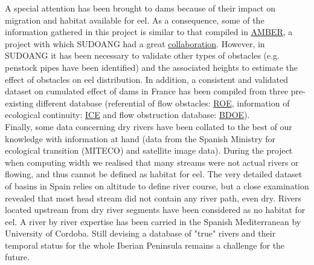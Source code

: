 \documentclass[pdftex,12pt,a4paper,svgnames]{report}\usepackage[]{graphicx}\usepackage[]{color}
\begin{document}
A special attention has been brought to dams because of their impact on
migration and habitat available for eel. As a consequence, some of the
information gathered in this project is similar to that compiled in 
\href{https://amber.international/}{AMBER}, a project with which SUDOANG had a
great
\href{https://amber.international/amber-collaborates-with-european-project-sudoang/}{collaboration}.
However, in SUDOANG it has been necessary to validate other types of obstacles
(e.g. penstock pipes have been identified) and the associated heights to
estimate the effect of obstacles on eel distribution. In addition, a consistent 
and validated dataset on cumulated effect of dams in France
has been compiled from three pre-existing different database (referential of
flow obstacles:
\href{https://www.data.gouv.fr/fr/datasets/les-referentiels-des-obstacles-a-lecoulement-sur-les-cours-deau-roe/}{ROE},
information of ecological continuity:
\href{https://professionnels.ofb.fr/en/node/731}{ICE} and flow
obstruction database:
\href{https://www.data.gouv.fr/es/datasets/obstacles-a-lecoulement-metropole/}{BDOE}).\\

Finally, some data concerning dry rivers have been collated to the best of our
knowledge with information at hand (data from the Spanish Ministry for
ecological transition (MITECO) and satellite image data). During the project
when computing width we realised that many streams were not actual rivers or
flowing, and thus cannot be defined as habitat for eel. The very detailed
dataset of basins in Spain relies on altitude to define river course, but a
close examination revealed that most head stream did not contain any river
path, even dry. Rivers located upstream from dry river segments have been
considered as no habitat for eel. A river by river expertise has been
carried in the Spanish Mediterranean by University of Cordoba. Still devising a
database of "true" rivers and their temporal status for the whole Iberian
Peninsula remains a challenge for the future.
	
\end{document}
